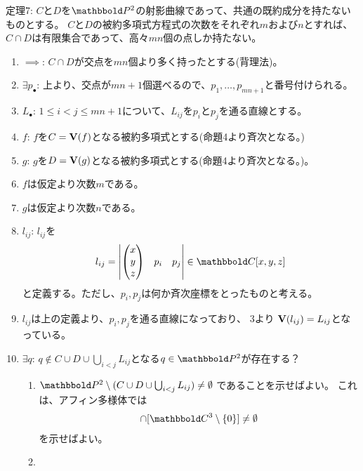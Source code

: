 \begin{framed}
  定理7:
  $C$と$D$を$\P^2$の射影曲線であって、共通の既約成分を持たないものとする。
  $C$と$D$の被約多項式方程式の次数をそれぞれ$m$および$n$とすれば、
  $C\cap D$は有限集合であって、高々$mn$個の点しか持たない。
\end{framed}
\begin{myproof}
  \begin{enumerate}
    \item $\implies$:
    $C\cap D$が交点を$mn$個より多く持ったとする(背理法)。
    \item $\exists p_\bullet$:
    上より、交点が$mn+1$個選べるので、$p_1,\dots,p_{mn+1}$と番号付けられる。
    \item $L_\bullet$:
    $1\le i < j \le mn+1$について、$L_{ij}$を$p_i$と$p_j$を通る直線とする。
    \item $f$: $f$を$C=\textbf V(f)$となる被約多項式とする(命題4より斉次となる。)
    \item $g$: $g$を$D=\textbf V(g)$となる被約多項式とする(命題4より斉次となる。)。
    \item $f$は仮定より次数$m$である。
    \item $g$は仮定より次数$n$である。
    \item $l_{ij}$:
    $l_{ij}$を
    \begin{align}
      l_{ij} =
      \begin{vmatrix}
        \tatev{x \\ y \\ z} & p_{i} & p_j
      \end{vmatrix} \in \C[x,y,z]
    \end{align}
    と定義する。ただし、$p_i,p_j$は何か斉次座標をとったものと考える。
    \item $l_{ij}$は上の定義より、$p_i, p_j$を通る直線になっており、
    3より
    $\textbf V(l_{ij}) = L_{ij}$となっている。
    \item $\exists q$:
    $q \notin C \cup D \cup \bigcup_{i<j} L_{ij}$となる$q\in \P^2$が存在する？
    \begin{enumerate}
      \item $\P^2 \setminus (C\cup D \cup \bigcup_{i<j}L_{ij}) \neq \emptyset$ であることを示せばよい。
      これは、アフィン多様体では
      \begin{align}
      [\C^3 \setminus (\var_a(f)\cup \var_a(g)\cup \bigcup_{i<j} \var_a(l_{ij})) ]\cap [\C^3\setminus \zeroset] \neq \emptyset
      \end{align}
      を示せばよい。
      \item

\end{enumerate}
\end{enumerate}
\end{myproof}
